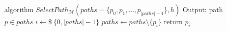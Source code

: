 \begin{Pseudocode}[float, caption={
Random Path Selection Strategy.
}, label={alg:select-path-rnd}]
algorithm $SelectPath_{\mathcal{M}}(paths = \{ p_0, p_1, \dots, p_{|paths|-1} \}, h)$
	Output: path $p \in paths$
	$i \leftarrow\$~ \{0, |paths|-1\}$
	$paths \leftarrow paths \setminus \{ p_i \}$
	return $p_i$
\end{Pseudocode}

